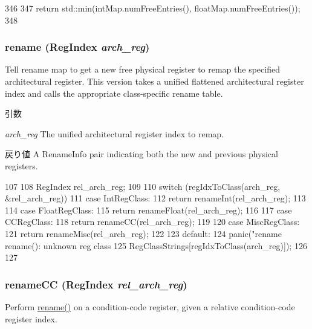 \begin{DoxyCode}
346     {
347         return std::min(intMap.numFreeEntries(), floatMap.numFreeEntries());
348     }
\end{DoxyCode}
\hypertarget{classUnifiedRenameMap_a7942f39856cc0a6ba2479855d2a7ab53}{
\subsubsection[{rename}]{ rename ({\bf RegIndex} {\em arch\_\-reg})}}
\label{classUnifiedRenameMap_a7942f39856cc0a6ba2479855d2a7ab53}
Tell rename map to get a new free physical register to remap the specified architectural register. This version takes a unified flattened architectural register index and calls the appropriate class-\/specific rename table. 
\begin{DoxyParams}{引数}
\item[{\em arch\_\-reg}]The unified architectural register index to remap. \end{DoxyParams}
\begin{DoxyReturn}{戻り値}
A RenameInfo pair indicating both the new and previous physical registers. 
\end{DoxyReturn}



\begin{DoxyCode}
107 {
108     RegIndex rel_arch_reg;
109 
110     switch (regIdxToClass(arch_reg, &rel_arch_reg)) {
111       case IntRegClass:
112         return renameInt(rel_arch_reg);
113 
114       case FloatRegClass:
115         return renameFloat(rel_arch_reg);
116 
117       case CCRegClass:
118         return renameCC(rel_arch_reg);
119 
120       case MiscRegClass:
121         return renameMisc(rel_arch_reg);
122 
123       default:
124         panic("rename rename(): unknown reg class %
125               RegClassStrings[regIdxToClass(arch_reg)]);
126     }
127 }
\end{DoxyCode}
\hypertarget{classUnifiedRenameMap_a1cebbe11de55db60d7ab86de7dbba6c7}{
\subsubsection[{renameCC}]{ renameCC ({\bf RegIndex} {\em rel\_\-arch\_\-reg})}}
\label{classUnifiedRenameMap_a1cebbe11de55db60d7ab86de7dbba6c7}
Perform \hyperlink{classUnifiedRenameMap_a7942f39856cc0a6ba2479855d2a7ab53}{rename()} on a condition-\/code register, given a relative condition-\/code register index. 


